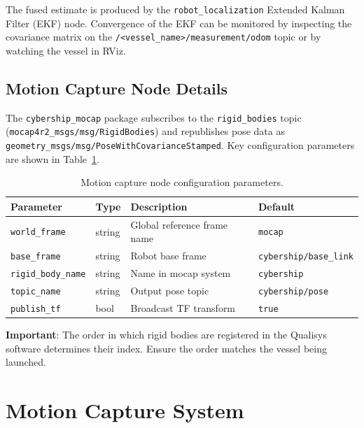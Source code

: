 \documentclass[12pt,a4paper]{article}
\begin{document}
	The fused estimate is produced by the \texttt{robot\_localization} Extended Kalman Filter (EKF)
	node. Convergence of the EKF can be monitored by inspecting the covariance matrix on the
	\texttt{/<vessel\_name>/measurement/odom} topic or by watching the vessel in RViz.
	
	\subsection{Motion Capture Node Details}
	
	The \texttt{cybership\_mocap} package subscribes to the \texttt{rigid\_bodies} topic
	(\texttt{mocap4r2\_msgs/msg/RigidBodies}) and republishes pose data as
	\texttt{geometry\_msgs/msg/PoseWithCovarianceStamped}. Key configuration parameters are shown
	in Table~\ref{tab:mocap_params}.
	
	\begin{table}[ht]
		\centering
		\begin{tabular}{llp{5cm}l}
			\toprule
			\textbf{Parameter}         & \textbf{Type} & \textbf{Description}        & \textbf{Default}              \\
			\midrule
			\texttt{world\_frame}      & string        & Global reference frame name & \texttt{mocap}                \\
			\texttt{base\_frame}       & string        & Robot base frame            & \texttt{cybership/base\_link} \\
			\texttt{rigid\_body\_name} & string        & Name in mocap system        & \texttt{cybership}            \\
			\texttt{topic\_name}       & string        & Output pose topic           & \texttt{cybership/pose}       \\
			\texttt{publish\_tf}       & bool          & Broadcast TF transform      & \texttt{true}                 \\
			\bottomrule
		\end{tabular}
		\caption{Motion capture node configuration parameters.}
		\label{tab:mocap_params}
	\end{table}
	
	\textbf{Important}: The order in which rigid bodies are registered in the Qualisys software
	determines their index. Ensure the order matches the vessel being launched.
	
	\section{Motion Capture System}
	\label{sec:mocap}
	
\end{document}
